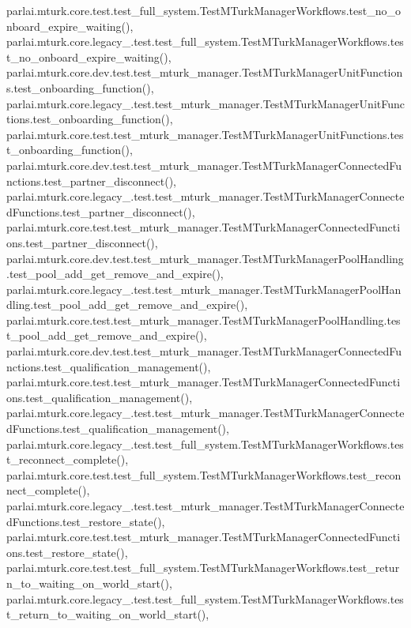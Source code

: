 parlai.\+mturk.\+core.\+test.\+test\+\_\+full\+\_\+system.\+Test\+M\+Turk\+Manager\+Workflows.\+test\+\_\+no\+\_\+onboard\+\_\+expire\+\_\+waiting(), parlai.\+mturk.\+core.\+legacy\+\_.\+test.\+test\+\_\+full\+\_\+system.\+Test\+M\+Turk\+Manager\+Workflows.\+test\+\_\+no\+\_\+onboard\+\_\+expire\+\_\+waiting(), parlai.\+mturk.\+core.\+dev.\+test.\+test\+\_\+mturk\+\_\+manager.\+Test\+M\+Turk\+Manager\+Unit\+Functions.\+test\+\_\+onboarding\+\_\+function(), parlai.\+mturk.\+core.\+legacy\+\_.\+test.\+test\+\_\+mturk\+\_\+manager.\+Test\+M\+Turk\+Manager\+Unit\+Functions.\+test\+\_\+onboarding\+\_\+function(), parlai.\+mturk.\+core.\+test.\+test\+\_\+mturk\+\_\+manager.\+Test\+M\+Turk\+Manager\+Unit\+Functions.\+test\+\_\+onboarding\+\_\+function(), parlai.\+mturk.\+core.\+dev.\+test.\+test\+\_\+mturk\+\_\+manager.\+Test\+M\+Turk\+Manager\+Connected\+Functions.\+test\+\_\+partner\+\_\+disconnect(), parlai.\+mturk.\+core.\+legacy\+\_.\+test.\+test\+\_\+mturk\+\_\+manager.\+Test\+M\+Turk\+Manager\+Connected\+Functions.\+test\+\_\+partner\+\_\+disconnect(), parlai.\+mturk.\+core.\+test.\+test\+\_\+mturk\+\_\+manager.\+Test\+M\+Turk\+Manager\+Connected\+Functions.\+test\+\_\+partner\+\_\+disconnect(), parlai.\+mturk.\+core.\+dev.\+test.\+test\+\_\+mturk\+\_\+manager.\+Test\+M\+Turk\+Manager\+Pool\+Handling.\+test\+\_\+pool\+\_\+add\+\_\+get\+\_\+remove\+\_\+and\+\_\+expire(), parlai.\+mturk.\+core.\+legacy\+\_.\+test.\+test\+\_\+mturk\+\_\+manager.\+Test\+M\+Turk\+Manager\+Pool\+Handling.\+test\+\_\+pool\+\_\+add\+\_\+get\+\_\+remove\+\_\+and\+\_\+expire(), parlai.\+mturk.\+core.\+test.\+test\+\_\+mturk\+\_\+manager.\+Test\+M\+Turk\+Manager\+Pool\+Handling.\+test\+\_\+pool\+\_\+add\+\_\+get\+\_\+remove\+\_\+and\+\_\+expire(), parlai.\+mturk.\+core.\+dev.\+test.\+test\+\_\+mturk\+\_\+manager.\+Test\+M\+Turk\+Manager\+Connected\+Functions.\+test\+\_\+qualification\+\_\+management(), parlai.\+mturk.\+core.\+test.\+test\+\_\+mturk\+\_\+manager.\+Test\+M\+Turk\+Manager\+Connected\+Functions.\+test\+\_\+qualification\+\_\+management(), parlai.\+mturk.\+core.\+legacy\+\_.\+test.\+test\+\_\+mturk\+\_\+manager.\+Test\+M\+Turk\+Manager\+Connected\+Functions.\+test\+\_\+qualification\+\_\+management(), parlai.\+mturk.\+core.\+legacy\+\_.\+test.\+test\+\_\+full\+\_\+system.\+Test\+M\+Turk\+Manager\+Workflows.\+test\+\_\+reconnect\+\_\+complete(), parlai.\+mturk.\+core.\+test.\+test\+\_\+full\+\_\+system.\+Test\+M\+Turk\+Manager\+Workflows.\+test\+\_\+reconnect\+\_\+complete(), parlai.\+mturk.\+core.\+legacy\+\_.\+test.\+test\+\_\+mturk\+\_\+manager.\+Test\+M\+Turk\+Manager\+Connected\+Functions.\+test\+\_\+restore\+\_\+state(), parlai.\+mturk.\+core.\+test.\+test\+\_\+mturk\+\_\+manager.\+Test\+M\+Turk\+Manager\+Connected\+Functions.\+test\+\_\+restore\+\_\+state(), parlai.\+mturk.\+core.\+test.\+test\+\_\+full\+\_\+system.\+Test\+M\+Turk\+Manager\+Workflows.\+test\+\_\+return\+\_\+to\+\_\+waiting\+\_\+on\+\_\+world\+\_\+start(), parlai.\+mturk.\+core.\+legacy\+\_.\+test.\+test\+\_\+full\+\_\+system.\+Test\+M\+Turk\+Manager\+Workflows.\+test\+\_\+return\+\_\+to\+\_\+waiting\+\_\+on\+\_\+world\+\_\+start(), 
